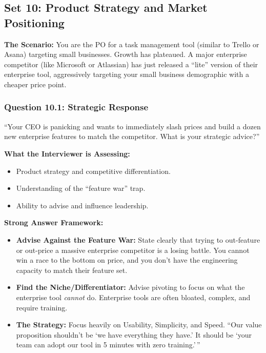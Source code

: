 \documentclass[
  11pt,
  openany,
  oneside]{book}
\providecommand{\tightlist}{%
  \setlength{\itemsep}{0pt}\setlength{\parskip}{0pt}}
\begin{document}
\bigskip

\subsection{Set 10: Product Strategy and Market
Positioning}\label{set-10-product-strategy-and-market-positioning}

\textbf{The Scenario:} You are the PO for a task management tool
(similar to Trello or Asana) targeting small businesses. Growth has
plateaued. A major enterprise competitor (like Microsoft or Atlassian)
has just released a ``lite'' version of their enterprise tool,
aggressively targeting your small business demographic with a cheaper
price point.

\subsubsection{Question 10.1: Strategic
Response}\label{question-10.1-strategic-response}

``Your CEO is panicking and wants to immediately slash prices and build
a dozen new enterprise features to match the competitor. What is your
strategic advice?''

\textbf{What the Interviewer is Assessing:}

\begin{itemize}
\tightlist
\item
  Product strategy and competitive differentiation.
\item
  Understanding of the ``feature war'' trap.
\item
  Ability to advise and influence leadership.
\end{itemize}

\textbf{Strong Answer Framework:}

\begin{itemize}
\tightlist
\item
  \textbf{Advise Against the Feature War:} State clearly that trying to
  out-feature or out-price a massive enterprise competitor is a losing
  battle. You cannot win a race to the bottom on price, and you don't
  have the engineering capacity to match their feature set.
\item
  \textbf{Find the Niche/Differentiator:} Advise pivoting to focus on
  what the enterprise tool \emph{cannot} do. Enterprise tools are often
  bloated, complex, and require training.
\item
  \textbf{The Strategy:} Focus heavily on Usability, Simplicity, and
  Speed. ``Our value proposition shouldn't be `we have everything they
  have.' It should be `your team can adopt our tool in 5 minutes with
  zero training.'\,''
\end{itemize}
\end{document}
